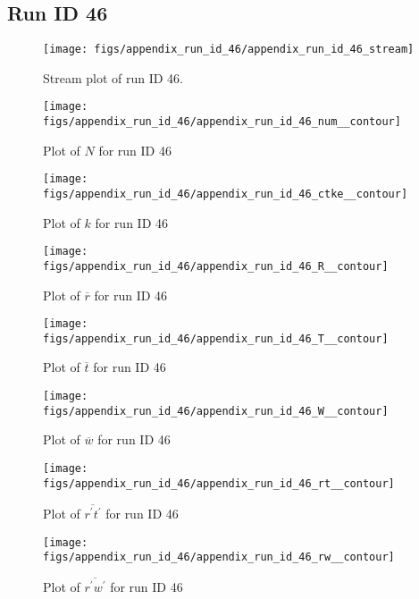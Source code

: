 \subsection{Run ID 46}
\begin{figure}[H]
\centering
\texttt{[image: figs/appendix\_run\_id\_46/appendix\_run\_id\_46\_stream]}
\caption{Stream plot of run ID 46.}
\label{fig:appendix_run_id_46_stream}
\end{figure}


\begin{figure}[H]
\centering
\texttt{[image: figs/appendix\_run\_id\_46/appendix\_run\_id\_46\_num\_\_contour]}
\caption{Plot of $N$ for run ID 46}
\label{fig:appendix_run_id_46_num__contour}
\end{figure}


\begin{figure}[H]
\centering
\texttt{[image: figs/appendix\_run\_id\_46/appendix\_run\_id\_46\_ctke\_\_contour]}
\caption{Plot of $k$ for run ID 46}
\label{fig:appendix_run_id_46_ctke__contour}
\end{figure}


\begin{figure}[H]
\centering
\texttt{[image: figs/appendix\_run\_id\_46/appendix\_run\_id\_46\_R\_\_contour]}
\caption{Plot of $\overline{r}$ for run ID 46}
\label{fig:appendix_run_id_46_R__contour}
\end{figure}


\begin{figure}[H]
\centering
\texttt{[image: figs/appendix\_run\_id\_46/appendix\_run\_id\_46\_T\_\_contour]}
\caption{Plot of $\overline{t}$ for run ID 46}
\label{fig:appendix_run_id_46_T__contour}
\end{figure}


\begin{figure}[H]
\centering
\texttt{[image: figs/appendix\_run\_id\_46/appendix\_run\_id\_46\_W\_\_contour]}
\caption{Plot of $\overline{w}$ for run ID 46}
\label{fig:appendix_run_id_46_W__contour}
\end{figure}


\begin{figure}[H]
\centering
\texttt{[image: figs/appendix\_run\_id\_46/appendix\_run\_id\_46\_rt\_\_contour]}
\caption{Plot of $\overline{r^\prime t^\prime}$ for run ID 46}
\label{fig:appendix_run_id_46_rt__contour}
\end{figure}


\begin{figure}[H]
\centering
\texttt{[image: figs/appendix\_run\_id\_46/appendix\_run\_id\_46\_rw\_\_contour]}
\caption{Plot of $\overline{r^\prime w^\prime}$ for run ID 46}
\label{fig:appendix_run_id_46_rw__contour}
\end{figure}


